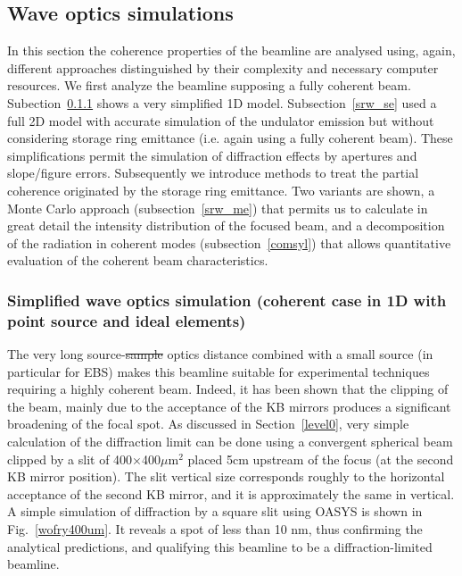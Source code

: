 \documentclass{iucr}              %
\begin{document}
% 

\subsection{Wave optics simulations}
\label{level2}

In this section the coherence properties of the beamline are analysed using, again, different approaches  distinguished by their complexity and necessary computer resources. We first analyze the beamline supposing a fully coherent beam. Subection~\ref{wofry} shows a very simplified 1D model. Subsection~\ref{srw_se} used a full 2D model with accurate simulation of the undulator emission but without considering storage ring emittance (i.e. again using a fully coherent beam). These simplifications permit the simulation of diffraction effects by apertures and slope/figure errors. Subsequently we introduce methods to treat the partial coherence originated by the storage ring emittance. Two variants are shown, a Monte Carlo approach (subsection~\ref{srw_me}) that permits us to calculate in great detail the intensity distribution of the focused beam, and a decomposition of the radiation in coherent modes (subsection~\ref{comsyl}) that allows   quantitative evaluation of the coherent beam characteristics.  


\subsubsection{Simplified wave optics simulation (coherent case in 1D with point source and ideal elements)}
\label{wofry}

The very long  source-{\color{green}\sout{sample} optics} distance combined with a small source (in particular for EBS) makes this beamline suitable for experimental techniques requiring a highly coherent beam. Indeed, it has been shown that the clipping of the beam, mainly due to the acceptance of the KB mirrors produces a significant broadening of the focal spot.  As discussed in Section~\ref{level0}, very simple calculation of the diffraction limit can be done using a convergent spherical beam clipped by a slit of 400$\times$400$ \mu$m$^2$ placed  5cm upstream of the focus (at the second KB mirror position). The slit vertical size corresponds roughly to the horizontal acceptance of the second KB mirror, and it is approximately the same in vertical. A simple simulation of diffraction by a square slit using OASYS is shown in Fig.~\ref{wofry400um}. It reveals a spot of less than 10 nm, thus confirming the analytical predictions, and qualifying this beamline to be a diffraction-limited beamline.  
\end{document}
